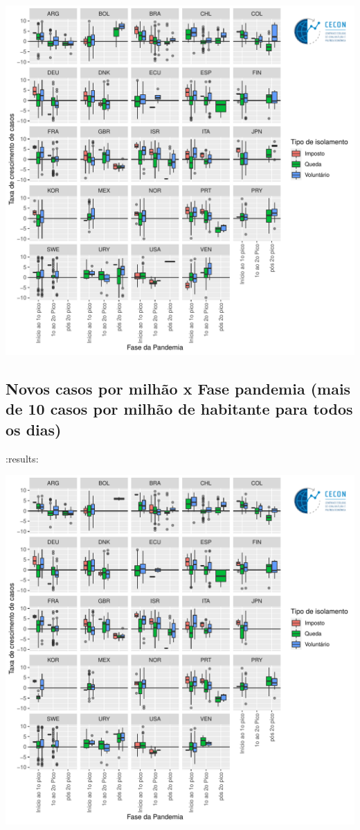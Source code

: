 \documentclass{SelfArx}
\begin{document}
\begin{center}
\includegraphics[width=.9\linewidth]{./figs/COVID/Casos_Policy_Todos.pdf}
\end{center}

\subsection*{Novos casos por milhão x Fase pandemia (mais de 10 casos por milhão de habitante para todos os dias)}
\label{sec:orgf5cfb91}

:results:
\begin{center}
\includegraphics[width=.9\linewidth]{./figs/COVID/Casos_Policy_10_Todos.pdf}
\end{center}
\end{document}
